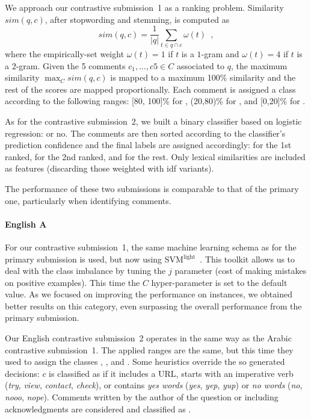 We approach our contrastive submission~1 as a ranking problem. Similarity 
$sim(q,c)$, after stopwording and stemming, is computed as 
\begin{equation}
 sim(q,c) = \frac{1}{|q|} \sum_{t\in q\cap c} \omega(t) \enspace ,
 \label{eq:overlap}
\end{equation}
% 
where the empirically-set weight $\omega(t)=1$ if $t$ is a $1$-gram and 
$\omega(t)=4$ if $t$ is a $2$-gram. Given the 5 comments 
$c_1,\ldots,c5\in C$ associated to $q$, the maximum similarity $\max_C sim(q,c)$ 
is mapped to a maximum 100\% similarity and the rest of the scores are mapped 
proportionally. Each comment is assigned a class according to the following 
ranges: [80, 100]\% for \dir, (20,80)\% for \rel, and [0,20]\% for \irel.


As for the contrastive submission~2, we built a binary classifier based on 
logistic regression: \dir or no. The comments are then sorted according to the 
classifier's prediction confidence and the final labels are assigned 
accordingly: \dir for the 1st ranked, \rel for the 2nd ranked, and \irel for the 
rest. Only lexical similarities are included as features (discarding those 
weighted with idf variants).


The performance of these two submissions is comparable to that of the primary 
one, particularly when identifying \rel comments. 

\paragraph{English A}

For our contrastive submission~1, the same machine learning schema as for the 
primary submission is used, but now using 
SVM$^\mathrm{light}$~\cite{Joachims:99}. This toolkit allows us to deal with 
the class imbalance by tuning the $j$ parameter (cost of making mistakes on 
positive examples). This time the $C$ hyper-parameter is set to the default 
value. As we focused on improving the performance on \pot instances, we obtained 
better results on this category, even surpassing the overall performance from 
the primary submission.

Our English contrastive submission~2 operates in the same way as the Arabic 
contrastive submission~1. The applied ranges are the same, but this time they used to 
assign the classes \good, \pot, and \bad. Some heuristics override the so 
generated decisions: $c$ is classified as \good if it includes a URL, starts 
with an imperative verb (\eg \textit{try}, \textit{view}, \textit{contact}, 
\textit{check}), or contains \textit{yes words} (\eg \textit{yes}, \textit{yep}, 
\textit{yup}) or \textit{no words} (\eg \textit{no}, \textit{nooo}, 
\textit{nope}). Comments written by the author of the question or including 
acknowledgments are considered \dial and classified as \bad. 



